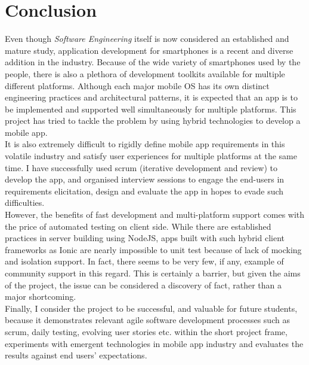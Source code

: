 \chapter{Conclusion}
\label{chap:conclusion}

Even though \textit{Software Engineering} itself is now considered an established and mature study, application development for smartphones is a recent and diverse addition in the industry. Because of the wide variety of smartphones used by the people, there is also a plethora of development toolkits available for multiple different platforms. Although each major mobile OS has its own distinct engineering practices and architectural patterns, it is expected that an app is to be implemented and supported well simultaneously for multiple platforms. This project has tried to tackle the problem by using hybrid technologies to develop a mobile app.\\

It is also extremely difficult to rigidly define mobile app requirements in this volatile industry and satisfy user experiences for multiple platforms at the same time. I have successfully used scrum (iterative development and review) to develop the app, and organised interview sessions to engage the end-users in requirements elicitation, design and evaluate the app in hopes to evade such difficulties.\\

However, the benefits of fast development and multi-platform support comes with the price of automated testing on client side. While there are established practices in server building using NodeJS, apps built with such hybrid client frameworks as Ionic are nearly impossible to unit test because of lack of mocking and isolation support. In fact, there seems to be very few, if any, example of community support in this regard. This is certainly a barrier, but given the aims of the project, the issue can be considered a discovery of fact, rather than a major shortcoming.\\

Finally, I consider the project to be successful, and valuable for future students, because it demonstrates relevant agile software development processes such as scrum, daily testing, evolving user stories etc. within the short project frame, experiments with emergent technologies in mobile app industry and evaluates the results against end users' expectations.